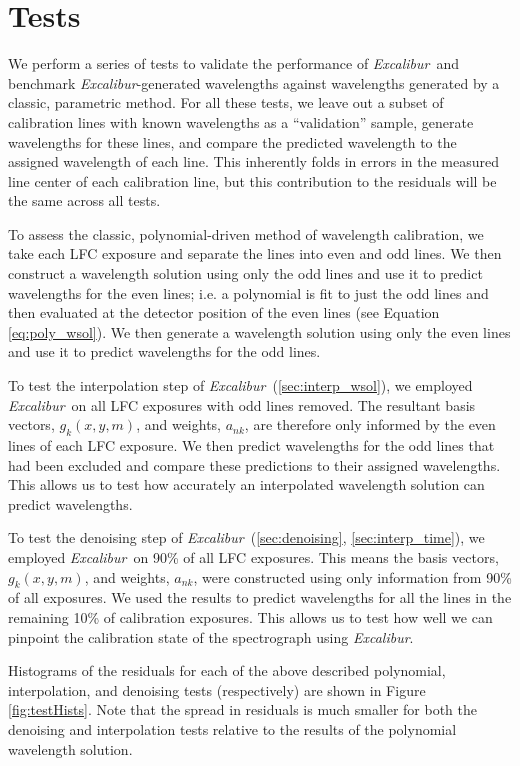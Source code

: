 \documentclass[modern]{aastex63}
\newcommand{\project}[1]{\textsl{#1}}
\newcommand{\name}{\project{Excalibur}}
\begin{document}
\section{Tests}\label{sec:tests}
We perform a series of tests to validate the performance of \name\ and benchmark \name -generated wavelengths against wavelengths generated by a classic, parametric method.  For all these tests, we leave out a subset of calibration lines with known wavelengths as a ``validation'' sample, generate wavelengths for these lines, and compare the predicted wavelength to the assigned wavelength of each line.  This inherently folds in errors in the measured line center of each calibration line, but this contribution to the residuals will be the same across all tests.

To assess the classic, polynomial-driven method of wavelength calibration, we take each LFC exposure and separate the lines into even and odd lines.  We then construct a wavelength solution using only the odd lines and use it to predict wavelengths for the even lines; i.e. a polynomial is fit to just the odd lines and then evaluated at the detector position of the even lines (see Equation \ref{eq:poly_wsol}).  We then generate a wavelength solution using only the even lines and use it to predict wavelengths for the odd lines.

To test the interpolation step of \name\ (\textsection \ref{sec:interp_wsol}), we employed \name\ on all LFC exposures with odd lines removed.  The resultant basis vectors, $g_k(x,y,m)$,  and weights, $a_{nk}$, are therefore only informed by the even lines of each LFC exposure.  We then predict wavelengths for the odd lines that had been excluded and compare these predictions to their assigned wavelengths.  This allows us to test how accurately an interpolated wavelength solution can predict wavelengths.

To test the denoising step of \name\ (\textsection \ref{sec:denoising}, \textsection\ref{sec:interp_time}), we employed \name\ on 90\% of all LFC exposures.  This means the basis vectors, $g_k(x,y,m)$,  and weights, $a_{nk}$, were constructed using only information from 90\% of all exposures.  We used the results to predict wavelengths for all the lines in the remaining 10\% of calibration exposures.  This allows us to test how well we can pinpoint the calibration state of the spectrograph using \name.

Histograms of the residuals for each of the above described polynomial, interpolation, and denoising tests (respectively) are shown in Figure \ref{fig:testHists}.  Note that the spread in residuals is much smaller for both the denoising and interpolation tests relative to the results of the polynomial wavelength solution.
\end{document}
